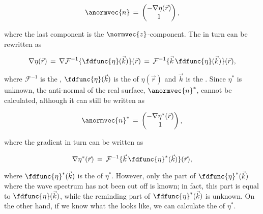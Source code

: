 {\begin{equation} \label{eq:anti_normal_from_gradient}
\anormvec{n} \,=\, \left(\!\!\!\begin{array}{c}-\nabla\eta(\vec{r}) \\ 1\end{array}\!\!\!\right),
\end{equation}

where the last component is the $\normvec{z}$-component. The \gradient in turn can be rewritten as

\begin{equation}
\nabla\eta(\vec{r}) \,=\, \nabla\mathcal{F}^{-1}\{\fdfunc{\eta}(\vec{k})\}(\vec{r}) \,=\, \mathcal{F}^{-1}\{\vec{k}\,\fdfunc{\eta}(\vec{k})\}(\vec{r}),
\end{equation}

where $\mathcal{F}^{-1}$ is the , $\fdfunc{\eta}(\vec{k})$ is the  of $\eta(\vec{r})$ and $\vec{k}$ is the . Since $\eta^*$ is unknown, the anti-normal of the real surface, $\anormvec{n}^*$, cannot be calculated, although it can still be written as

\begin{equation} \label{eq:eta_anti_normal}
\anormvec{n}^* \,=\, \left(\!\!\!\begin{array}{c}-\nabla\eta^*(\vec{r}) \\ 1\end{array}\!\!\!\right),
\end{equation}

where the gradient in turn can be written as

\begin{equation}
\nabla\eta^*(\vec{r}) \,=\, \mathcal{F}^{-1}\{\vec{k}\,\fdfunc{\eta}^*(\vec{k})\}(\vec{r}),
\end{equation}

where $\fdfunc{\eta}^*(\vec{k})$ is the  of $\eta^*$. However, only the part of $\fdfunc{\eta}^*(\vec{k})$ where the wave spectrum has not been cut off is known; in fact, this part is equal to $\fdfunc{\eta}(\vec{k})$, while the reminding part of $\fdfunc{\eta}^*(\vec{k})$ is unknown. On the other hand, if we know what the  looks like, we can calculate the  of $\eta^*$.

}
